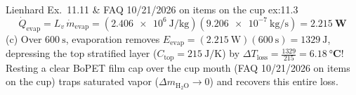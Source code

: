 \begin{workedexample}{Lienhard Ex.\ 11.11 \& FAQ 10/21/2026 on items on the cup }{ex:11.3}
\[\]
\[
  \dot{Q}_{\mathrm{evap}} = L_v\,\dot{m}_{\mathrm{evap}} = (\SI{2.406e6}{\joule\per\kilogram})(\SI{9.206e-7}{\kilogram\per\second}) = \mathbf{\SI{2.215}{\watt}}
\]
(c) Over $\SI{600}{\second}$, evaporation removes $E_{\mathrm{evap}} = (\SI{2.215}{\watt})(\SI{600}{\second}) = \SI{1329}{\joule}$, depressing the top stratified layer ($C_{\mathrm{top}} = \SI{215}{\joule\per\kelvin}$) by $\Delta T_{\mathrm{loss}} = \frac{1329}{215} = \mathbf{\SI{6.18}{\celsius}}$! Resting a clear BoPET film cap over the cup mouth (FAQ 10/21/2026 on items on the cup) traps saturated vapor ($\Delta m_{\mathrm{H_2O}} \to 0$) and recovers this entire loss.
\end{workedexample}

